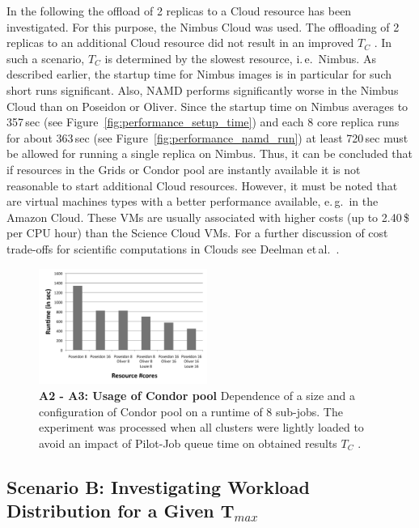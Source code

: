 \documentclass[conference,final]{IEEEtran}
\newcommand{\up}{\vspace*{-1em}}
\newcommand{\tc}{$T_{C}$ }
\begin{document}
In the following the offload of 2 replicas to a Cloud resource has been
investigated. For this purpose, the Nimbus Cloud was used. The offloading of 2 replicas 
to an additional Cloud resource did not result in an 
improved \tc. In such a scenario, \tc is determined by
the slowest resource, i.\,e.\ Nimbus. As described earlier, the
startup time for Nimbus images is in particular for such short runs
significant. Also, NAMD performs significantly worse in the Nimbus
Cloud than on Poseidon or Oliver. Since the startup time on Nimbus
averages to 357\,sec (see Figure~\ref{fig:performance_setup_time}) and
each 8 core replica runs for about 363\,sec (see
Figure~\ref{fig:performance_namd_run}) at least 720\,sec must be
allowed for running a single replica on Nimbus. Thus, it can be
concluded that if resources in the Grids or Condor pool are instantly
available it is not reasonable to start additional Cloud resources.
However, it must be noted that are virtual machines types with a better
performance available, e.\,g.\ in the Amazon Cloud. These VMs 
are usually associated with higher costs (up to 2.40\,\$ per CPU hour) than
the Science Cloud VMs. For a further discussion of cost trade-offs for 
scientific computations in Clouds see Deelman et\,al.~\cite{1413421}. 

\begin{figure}[htbp]
    \centering
        \includegraphics[width=0.49\textwidth]{performance/condor_pools_runtime}
        \caption{\textbf{A2 - A3: Usage of Condor pool}
	Dependence of a size and a configuration of Condor pool on a runtime of 8 sub-jobs.
	The experiment was processed when all clusters were lightly loaded to avoid an impact
	of Pilot-Job queue time on obtained results \tc.}
    \label{fig:performance_8replica_grid_cloud_condor}
\end{figure}


\subsection{Scenario B: Investigating Workload Distribution for a Given T$_{max}$}
\up
\end{document}
